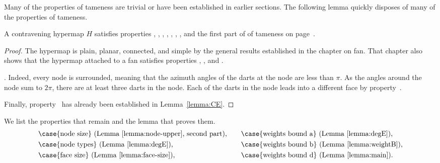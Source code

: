 Many of the properties of tameness are trivial or have been
established in earlier sections.  The following lemma quickly disposes
of many of the properties of tameness.

\begin{lemma}[]\label{lemma:multi}
  A contravening hypermap $H$ satisfies properties ,
  , , , , , , and the first
  part of 
of tameness on page~\pageref{def:tame}.
\end{lemma}

\begin{proof}
  The hypermap is plain, planar, connected, and simple by the general
  results established in the chapter on fan.  That chapter also shows
  that the hypermap attached to a fan satisfies properties
  , , and .

  .  Indeed, every node is
  surrounded, meaning that the azimuth angles of the darts at the
  node are less than $\pi$.  As the angles around the node sum to
  $2\pi$, there are at least three darts in the node. Each of the
  darts in the node leads into a different face by
  property~.

  Finally, property~ has already been established in
  Lemma~\ref{lemma:CE}.
\end{proof}

We list the  properties that remain and the lemma that proves them.
\def\x#1{\text{#1}}
\begin{alignat*}{8}
&
\x{\case{node size} (Lemma~\ref{lemma:node-upper}, second part),}
&&\quad
\x{\case{weights bound a} (Lemma~\ref{lemma:degE}),} 
\\ &
\x{\case{node types} (Lemma~\ref{lemma:degE}),} 
&&\quad
\x{\case{weights bound b} (Lemma~\ref{lemma:weightB}),} 
\\ &
\x{\case{face size} (Lemma~\ref{lemma:face-size}),} 
&&\quad
\x{\case{weights bound d} (Lemma~\ref{lemma:main}).} 
\end{alignat*}


